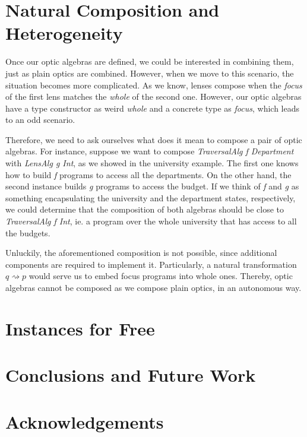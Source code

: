 \documentclass[a4paper]{article}
\begin{document}
\section{Natural Composition and Heterogeneity}

Once our optic algebras are defined, we could be interested in combining them,
just as plain optics are combined. However, when we move to this scenario, the
situation becomes more complicated. As we know, lenses compose when the
\emph{focus} of the first lens matches the \emph{whole} of the second one.
However, our optic algebras have a type constructor as weird \emph{whole} and a
concrete type as \emph{focus}, which leads to an odd scenario.

Therefore, we need to ask ourselves what does it mean to compose a pair of optic
algebras. For instance, suppose we want to compose \emph{TraversalAlg f
Department} with \emph{LensAlg g Int}, as we showed in the university example.
The first one knows how to build \emph{f} programs to access all the
departments. On the other hand, the second instance builds \emph{g} programs to
access the budget. If we think of \emph{f} and \emph{g} as something
encapsulating the university and the department states, respectively, we could
determine that the composition of both algebras should be close to
\emph{TraversalAlg f Int}, ie. a program over the whole university that has
access to all the budgets.

Unluckily, the aforementioned composition is not possible, since additional
components are required to implement it. Particularly, a natural transformation
${q \rightsquigarrow p}$ would serve us to embed focus programs into whole ones.
Thereby, optic algebras cannot be composed as we compose plain optics, in an
autonomous way.

\section{Instances for Free}

\section{Conclusions and Future Work}

\section{Acknowledgements}

{}

\end{document}
